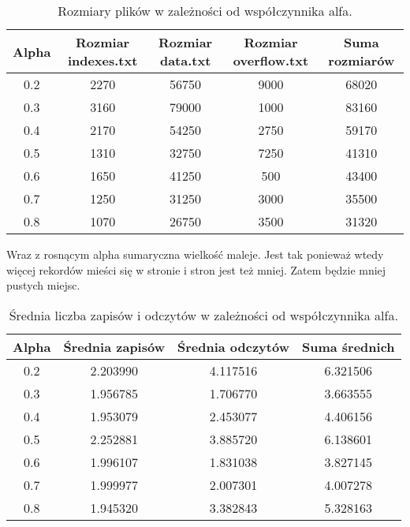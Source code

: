 \documentclass{article}
\begin{document}
    \begin{table}[H]
        \centering
        \begin{tabular}{ccccc}
        \toprule
        \textbf{Alpha} & \textbf{Rozmiar indexes.txt} & \textbf{Rozmiar data.txt} & \textbf{Rozmiar overflow.txt} & \textbf{Suma rozmiarów} \\
        \midrule
        0.2 & 2270 & 56750 & 9000  & 68020  \\
        0.3 & 3160 & 79000 & 1000  & 83160  \\
        0.4 & 2170 & 54250 & 2750  & 59170  \\
        0.5 & 1310 & 32750 & 7250  & 41310  \\
        0.6 & 1650 & 41250 & 500   & 43400  \\
        0.7 & 1250 & 31250 & 3000  & 35500  \\
        0.8 & 1070 & 26750 & 3500  & 31320  \\
        \bottomrule
        \end{tabular}
        \caption{Rozmiary plików w zależności od współczynnika alfa.}
        \label{tab:file_sizes}
    \end{table}

    \noindent Wraz z rosnącym alpha sumaryczna wielkość maleje. Jest tak ponieważ wtedy więcej rekordów mieści się w stronie i stron jest też mniej. 
    Zatem będzie mniej pustych miejsc.
                
    \begin{table}[H]
        \centering
        \begin{tabular}{cccc}
        \toprule
        \textbf{Alpha} & \textbf{Średnia zapisów} & \textbf{Średnia odczytów} & \textbf{Suma średnich} \\
        \midrule
        0.2 & 2.203990 & 4.117516 & 6.321506 \\
        0.3 & 1.956785 & 1.706770 & 3.663555 \\
        0.4 & 1.953079 & 2.453077 & 4.406156 \\
        0.5 & 2.252881 & 3.885720 & 6.138601 \\
        0.6 & 1.996107 & 1.831038 & 3.827145 \\
        0.7 & 1.999977 & 2.007301 & 4.007278 \\
        0.8 & 1.945320 & 3.382843 & 5.328163 \\
        \bottomrule
        \end{tabular}
        \caption{Średnia liczba zapisów i odczytów w zależności od współczynnika alfa.}
        \label{tab:average_operations}
    \end{table}
\end{document}
